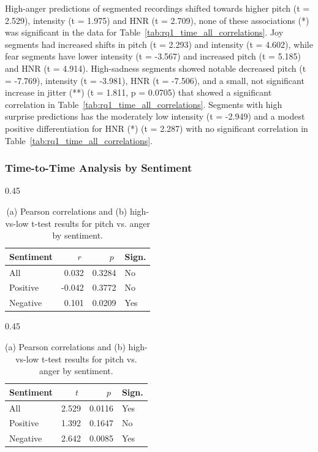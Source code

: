 High-anger predictions of segmented recordings shifted towards higher pitch (t = 2.529), intensity (t = 1.975) and HNR (t = 2.709), none of these associations (*) was significant in the data for Table~\ref{tab:rq1_time_all_correlations}. 
Joy segments had increased shifts in pitch (t = 2.293) and intensity (t = 4.602), while fear segments have lower intensity (t = -3.567) and increased pitch (t = 5.185) and HNR (t = 4.914). 
High-sadness segments showed notable decreased pitch (t = -7.769), intensity (t = -3.981), HNR (t = -7.506), and a small, not significant increase in jitter (**) (t = 1.811, p = 0.0705) that showed a significant correlation in Table~\ref{tab:rq1_time_all_correlations}.
Segments with high surprise predictions has the moderately low intensity (t = -2.949) and a modest positive differentiation for HNR (*) (t = 2.287) with no significant correlation in Table~\ref{tab:rq1_time_all_correlations}. 
  


  \subsubsection{Time-to-Time Analysis by Sentiment}
  \begin{table}[H]
    \centering
    \begin{subtable}{0.45\textwidth}
      \centering
      \caption{Pitch and Anger (Pearson r)}\label{tab:rq1_corr_pitch_anger}
      \begin{tabular}{l r r l}
        \toprule
        Sentiment & \(\;r\;\) & \(\;p\;\) & Sign. \\
        \midrule
        All        &  0.032        & 0.3284    & No          \\
        Positive   & -0.042        & 0.3772    & No          \\
        Negative   &  0.101        & 0.0209    & Yes         \\
        \bottomrule
      \end{tabular}
    \end{subtable}\hfill
    \begin{subtable}{0.45\textwidth}
      \centering
      \caption{Pitch and Anger (t-test)}\label{tab:rq1_ttest_pitch_anger}
      \begin{tabular}{l r r l}
        \toprule
        Sentiment & \(\;t\;\) & \(\;p\;\) & Sign. \\
        \midrule
        All        &  2.529      & 0.0116    & Yes         \\
        Positive   &  1.392      & 0.1647    & No          \\
        Negative   &  2.642      & 0.0085    & Yes         \\
        \bottomrule
      \end{tabular}
    \end{subtable}
    \caption{(a) Pearson correlations and (b) high-vs-low t-test results for pitch vs. anger by sentiment.}
    \label{tab:rq1_pitch_anger_side_by_side}
  \end{table}
  
